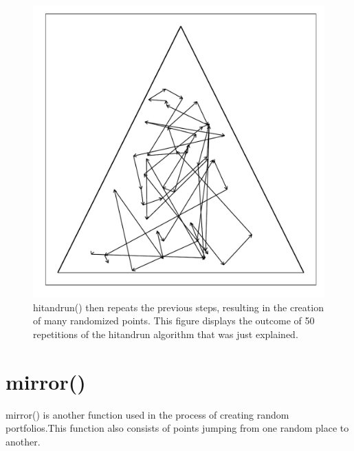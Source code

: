 \documentclass{article}\usepackage{graphicx, color}
\makeatletter
\def\maxwidth{ %
  \ifdim\Gin@nat@width>\linewidth
    \linewidth
  \else
    \Gin@nat@width
  \fi
}
\newenvironment{knitrout}{}{} %
\makeatother
\begin{document}
\begin{figure}[H]
\begin{knitrout}
\color{fgcolor}
\includegraphics[width=\maxwidth]{figure/hitandrun_walkthrough7} 

\end{knitrout}

\caption{hitandrun() then repeats the previous steps, resulting in the creation of many randomized points. This figure displays the outcome of 50 repetitions of the hitandrun algorithm that was just explained.}
\end{figure}

\section*{mirror()}

mirror() is another function used in the process of creating random portfolios.This function also consists of points jumping from one random place to another.
\end{document}
